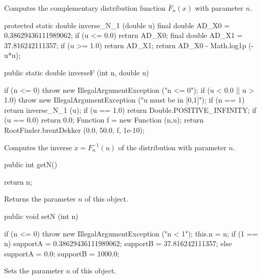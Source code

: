 \begin{tabb}
  Computes the complementary  distribution function  $\bar F_n(x)$
  with parameter $n$.
\end{tabb}
\begin{code}\begin{hide}
   protected static double inverse_N_1 (double u)
   {
      final double AD_X0 = 0.38629436111989062;
      if (u <= 0.0)
         return AD_X0;
      final double AD_X1 = 37.816242111357;
      if (u >= 1.0)
         return AD_X1;
      return AD_X0 - Math.log1p (-u*u);
   }\end{hide}

   public static double inverseF (int n, double u)\begin{hide} {
      if (n <= 0)
         throw new IllegalArgumentException ("n <= 0");
      if (u < 0.0 || u > 1.0)
         throw new IllegalArgumentException ("u must be in [0,1]");
      if (n == 1)
         return inverse_N_1 (u);
      if (u == 1.0)
         return Double.POSITIVE_INFINITY;
      if (u == 0.0)
         return 0.0;
      Function f = new Function (n,u);
      return RootFinder.brentDekker (0.0, 50.0, f, 1e-10);
   }\end{hide}
\end{code}
\begin{tabb}
  Computes the inverse $x = F_n^{-1}(u)$ of the
  \ad{} distribution with parameter $n$.
\end{tabb}
\begin{code}

   public int getN()\begin{hide} {
      return n;
   }\end{hide}
\end{code}
 \begin{tabb} Returns the parameter $n$ of this object.
 \end{tabb}
\begin{code}

   public void setN (int n)\begin{hide} {
      if (n <= 0)
         throw new IllegalArgumentException ("n < 1");
      this.n = n;
      if (1 == n) {
         supportA = 0.38629436111989062;
         supportB = 37.816242111357;
      } else {
         supportA = 0.0;
         supportB = 1000.0;
      }
   }\end{hide}
\end{code}
 \begin{tabb} Sets the parameter $n$ of this object.
 \end{tabb}
